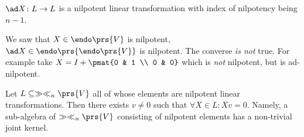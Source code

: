 \documentclass[10pt,a4paper,twoside,openany,hidelinks]{book}
\begin{document}
\begin{remark}
$\ad X \colon L \to L$ 
is a nilpotent linear transformation with index of nilpotency being $n-1$.
\end{remark}
\begin{remark}
We saw that $X \in \endo\prs{V}$ is nilpotent, $\ad X \in \endo\prs{\endo\prs{V}}$ is nilpotent. The converse \emph{is not} true. For example take $X = I + \pmat{0 & 1 \\ 0 & 0}$ which is \emph{not} nilpotent, but is ad-nilpotent.
\end{remark}
\begin{theorem}
Let $L \subseteq \gg \ll_n\prs{V}$ all of whose elements are nilpotent linear transformations. Then there exists $v \neq 0$ such that $\forall X \in L \colon Xv = 0$. Namely, a sub-algebra of $\gg \ll_n\prs{V}$ consisting of nilpotent elements has a non-trivial joint kernel.
\end{theorem}
\end{document}
